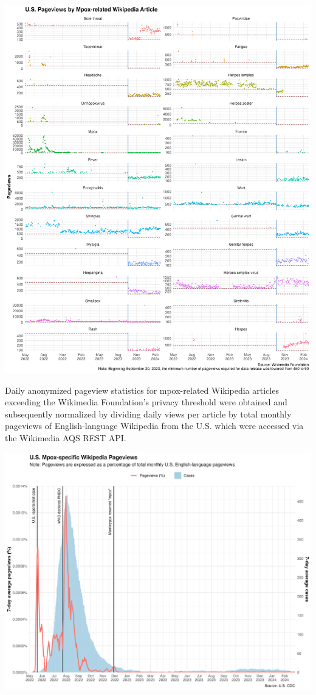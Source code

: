 \documentclass[
  12pt,
]{article}
\begin{document}
\includegraphics{images/pageviews-mpox-related.png}

Daily anonymized pageview statistics for mpox-related Wikipedia articles
exceeding the Wikimedia Foundation's privacy threshold were obtained and
subsequently normalized by dividing daily views per article by total
monthly pageviews of English-language Wikipedia from the U.S. which were
accessed via the Wikimedia AQS REST API.

\includegraphics{images/cases-&-pageviews-rolling-avg.png}\\
\end{document}
